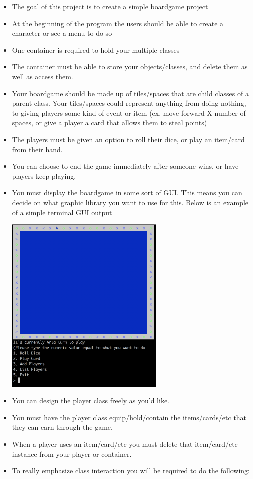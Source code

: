 \documentclass{42-en}
\begin{document}
	\begin{itemize}

		\item The goal of this project is to create a simple boardgame project
		\item At the beginning of the program the users should be able
		to create a character or see a menu to do so
		\item One container is required to hold your multiple classes
		\item The container must be able to store your objects/classes, and delete them as well as access them.
		\item Your boardgame should be made up of tiles/spaces that are child classes
		of a parent class. Your tiles/spaces could represent anything from doing nothing,
		to giving players some kind of event or item (ex. move forward X number of spaces,
		or give a player a card that allows them to steal points)
		\item The players must be given an option to roll their dice, or play an
		item/card from their hand.
		\item You can choose to end the game immediately after someone wins, or have
		players keep playing.
		\item You must display the boardgame in some sort of GUI. This means
		you can decide on what graphic library you want to use for this. Below is
		an example of a simple terminal GUI output

		\begin{center}
			\includegraphics[width=0.6\textwidth]{images/boardgame.png}
		\end{center}

		\item You can design the player class freely as you'd like.
		\item You must have the player class equip/hold/contain the items/cards/etc that
		they can earn through the game.
		\item When a player uses an item/card/etc you must delete that item/card/etc instance from 
		your player or container.
		\item To really emphasize class interaction you will be required to do the following:


\end{itemize}
\end{document}
